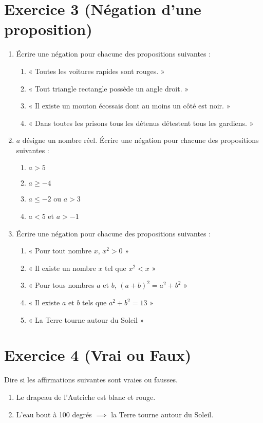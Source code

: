 \documentclass[12pt,a4paper]{article}
\begin{document}
\section*{Exercice 3 (Négation d’une proposition)}
\begin{enumerate}
\item Écrire une négation pour chacune des propositions suivantes :
  \begin{enumerate}
  \item « Toutes les voitures rapides sont rouges. »
  \item « Tout triangle rectangle possède un angle droit. »
  \item « Il existe un mouton écossais dont au moins un côté est noir. »
  \item « Dans toutes les prisons tous les détenus détestent tous les gardiens. »
  \end{enumerate}

\item $a$ désigne un nombre réel. Écrire une négation pour chacune des propositions suivantes :
  \begin{enumerate}
  \item $a>5$
  \item $a \geq -4$
  \item $a \leq -2$ ou $a > 3$
  \item $a < 5$ et $a > -1$
  \end{enumerate}

\item Écrire une négation pour chacune des propositions suivantes :
  \begin{enumerate}
  \item « Pour tout nombre $x$, $x^2>0$ »
  \item « Il existe un nombre $x$ tel que $x^2<x$ »
  \item « Pour tous nombres $a$ et $b$, $(a+b)^2=a^2+b^2$ »
  \item « Il existe $a$ et $b$ tels que $a^2+b^2=13$ »
  \item « La Terre tourne autour du Soleil »
  \end{enumerate}
\end{enumerate}

\section*{Exercice 4 (Vrai ou Faux)}
Dire si les affirmations suivantes sont vraies ou fausses.
\begin{enumerate}
\item Le drapeau de l’Autriche est blanc et rouge.
\item L’eau bout à 100 degrés $\implies$ la Terre tourne autour du Soleil.
\end{enumerate}
\end{document}
